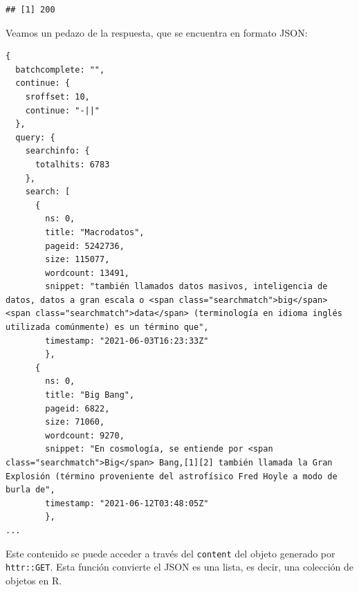 \documentclass[
]{book}
\newenvironment{Shaded}{\begin{snugshade}}{\end{snugshade}}
\newcommand{\CommentTok}[1]{\textcolor[rgb]{0.56,0.35,0.01}{\textit{#1}}}
\newcommand{\FunctionTok}[1]{\textcolor[rgb]{0.00,0.00,0.00}{#1}}
\newcommand{\NormalTok}[1]{#1}
\newcommand{\OtherTok}[1]{\textcolor[rgb]{0.56,0.35,0.01}{#1}}
\newcommand{\SpecialCharTok}[1]{\textcolor[rgb]{0.00,0.00,0.00}{#1}}
\newcommand{\StringTok}[1]{\textcolor[rgb]{0.31,0.60,0.02}{#1}}
\begin{document}
\begin{Shaded}
\end{Shaded}

\begin{verbatim}
## [1] 200
\end{verbatim}

Veamos un pedazo de la respuesta, que se encuentra en formato JSON:

\begin{verbatim}
{
  batchcomplete: "",
  continue: {
    sroffset: 10,
    continue: "-||"
  },
  query: {
    searchinfo: {
      totalhits: 6783
    },
    search: [
      {
        ns: 0,
        title: "Macrodatos",
        pageid: 5242736,
        size: 115077,
        wordcount: 13491,
        snippet: "también llamados datos masivos, inteligencia de datos, datos a gran escala o <span class="searchmatch">big</span> <span class="searchmatch">data</span> (terminología en idioma inglés utilizada comúnmente) es un término que",
        timestamp: "2021-06-03T16:23:33Z"
        },
      {
        ns: 0,
        title: "Big Bang",
        pageid: 6822,
        size: 71060,
        wordcount: 9270,
        snippet: "En cosmología, se entiende por <span class="searchmatch">Big</span> Bang,[1]​[2]​ también llamada la Gran Explosión (término proveniente del astrofísico Fred Hoyle a modo de burla de",
        timestamp: "2021-06-12T03:48:05Z"
        },
...
\end{verbatim}

Este contenido se puede acceder a través del \texttt{content} del objeto generado por \texttt{httr::GET}. Esta función convierte el JSON es una lista, es decir, una colección de objetos en R.
\end{document}
